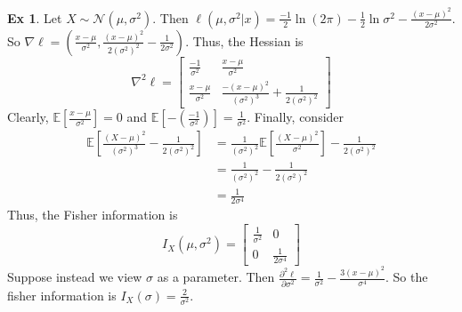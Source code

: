 \documentclass{article}
\theoremstyle{definition}\newtheorem{definition}{DEF}
\theoremstyle{definition}\newtheorem{example}{Ex}
\theoremstyle{lemma}\newtheorem{lemma}{Lemma}
\theoremstyle{corrolary}\newtheorem{corrolary}{Cor}
\begin{document}
\begin{example}
Let $X\sim \mathcal{N}(\mu, \sigma^2)$.
Then $\ell(\mu, \sigma^2 | x) = \frac{-1}{2} \ln (2\pi ) - \frac{1}{2}\ln \sigma^2 -\frac{(x-\mu)^2}{2\sigma^2}$.
So $\nabla \ell = \left( \frac{x-\mu}{\sigma^2} , \frac{(x-\mu)^2}{2(\sigma^2)^2} -\frac{1}{2\sigma^2}\right)$.
Thus, the Hessian is
\begin{equation*}
\nabla^2 \ell =
\begin{bmatrix}
\frac{-1}{\sigma^2} & \frac{x-\mu}{\sigma^2} \\
\frac{x-\mu}{\sigma^2} & \frac{-(x-\mu)^2}{(\sigma^2)^3} +\frac{1}{2(\sigma^2)^2}
\end{bmatrix}
\end{equation*}
Clearly, $\mathbb{E}\left[\frac{x-\mu}{\sigma^2}\right]=0$ and $\mathbb{E}\left[ -\left( \frac{-1}{\sigma^2}\right)\right]=\frac{1}{\sigma^2}$.
Finally, consider
\begin{align*}
\mathbb{E}\left[ \frac{(X-\mu)^2}{(\sigma^2)^3} -\frac{1}{2(\sigma^2)^2} \right]
&= \frac{1}{(\sigma^2)^2} \mathbb{E}\left[ \frac{(X-\mu)^2}{\sigma^2}\right] - \frac{1}{2(\sigma^2)^2} \\
&= \frac{1}{(\sigma^2)^2} - \frac{1}{2(\sigma^2)^2} \\
&= \frac{1}{2\sigma^4}
\end{align*}
Thus, the Fisher information is
\begin{equation*}
I_X(\mu, \sigma^2) =
\begin{bmatrix}
\frac{1}{\sigma^2} & 0 \\
0 & \frac{1}{2\sigma^4}
\end{bmatrix}
\end{equation*}
Suppose instead we view $\sigma$ as a parameter.
Then $\frac{\partial^2 \ell}{\partial \sigma^2} = \frac{1}{\sigma^2} - \frac{3(x-\mu)^2}{\sigma^4}$.
So the fisher information is $I_X(\sigma)=\frac{2}{\sigma^2}$.
\end{example}
\end{document}
